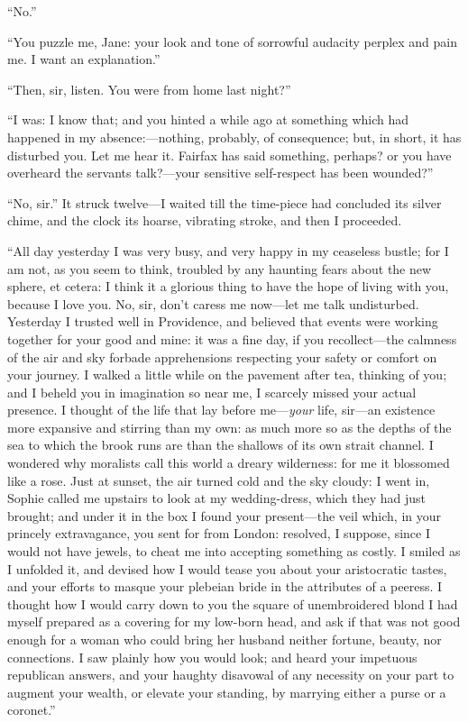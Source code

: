 \enquote{No.}

\enquote{You puzzle me, Jane: your look and tone of sorrowful audacity
perplex and pain me.  I want an explanation.}

\enquote{Then, sir, listen.  You were from home last night?}

\enquote{I was: I know that; and you hinted a while ago at something
which had happened in my absence:---nothing, probably, of consequence;
but, in short, it has disturbed you.  Let me hear it.  \Mrs{} Fairfax has
said something, perhaps? or you have overheard the servants talk?---your
sensitive self-respect has been wounded?}

\enquote{No, sir.}  It struck twelve---I waited till the time-piece had
concluded its silver chime, and the clock its hoarse, vibrating stroke,
and then I proceeded.

\enquote{All day yesterday I was very busy, and very happy in my ceaseless
bustle; for I am not, as you seem to think, troubled by any haunting
fears about the new sphere, et cetera: I think it a glorious thing to
have the hope of living with you, because I love you.  No, sir, don't
caress me now---let me talk undisturbed.  Yesterday I trusted well in
Providence, and believed that events were working together for your good
and mine: it was a fine day, if you recollect---the calmness of the air
and sky forbade apprehensions respecting your safety or comfort on your
journey.  I walked a little while on the pavement after tea, thinking of
you; and I beheld you in imagination so near me, I scarcely missed your
actual presence.  I thought of the life that lay before me---\emph{your}
life, sir---an existence more expansive and stirring than my own: as
much more so as the depths of the sea to which the brook runs are than
the shallows of its own strait channel.  I wondered why moralists call
this world a dreary wilderness: for me it blossomed like a rose.  Just
at sunset, the air turned cold and the sky cloudy: I went in, Sophie
called me upstairs to look at my wedding-dress, which they had just
brought; and under it in the box I found your present---the veil which,
in your princely extravagance, you sent for from London: resolved, I
suppose, since I would not have jewels, to cheat me into accepting
something as costly.  I smiled as I unfolded it, and devised how I would
tease you about your aristocratic tastes, and your efforts to masque
your plebeian bride in the attributes of a peeress.  I thought how I
would carry down to you the square of unembroidered blond I had myself
prepared as a covering for my low-born head, and ask if that was not
good enough for a woman who could bring her husband neither fortune,
beauty, nor connections.  I saw plainly how you would look; and heard
your impetuous republican answers, and your haughty disavowal of any
necessity on your part to augment your wealth, or elevate your standing,
by marrying either a purse or a coronet.}

